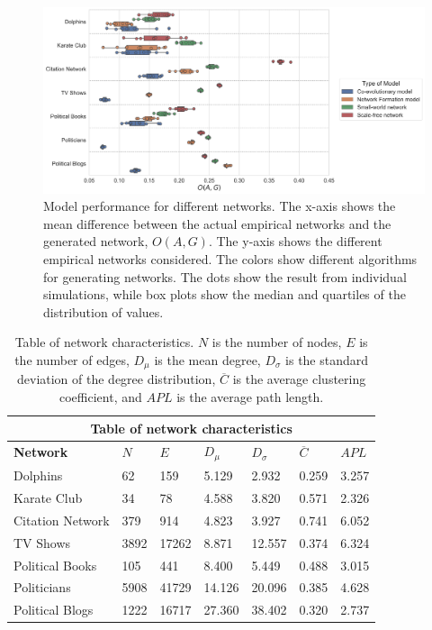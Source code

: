 \documentclass[11pt]{article}
\begin{document}
\begin{figure}[H]
    \centering
    \includegraphics[width=.9\linewidth]{../plots/overall/Model_Evaluation.png}
  \caption{Model performance for different networks. The x-axis shows the mean difference between the actual empirical networks and the generated network, $O(A, G)$. The y-axis shows the different empirical networks considered. The colors show different algorithms for generating networks. The dots show the result from individual simulations, while box plots show the median and quartiles of the distribution of values.}
  \label{fig:eval_mean}
\end{figure}

\begin{table}[H]
    \begin{center}
        
    \begin{tabular}{ |p{3cm}||p{1.6cm}|p{1.6cm}|p{1.6cm}|p{1.6cm}|p{1.6cm}|p{1.6cm}|}
        \hline
        \multicolumn{7}{|c|}{Table of network characteristics} \\
        \hline
        \bf{Network} & $N$ & $E$ & $D_{\mu}$ & $D_{\sigma}$ & $\overline{C}$ & $APL$\\
        \hline
        Dolphins   & 62    &159&   5.129&   2.932 &   0.259 & 3.257\\
        Karate Club &34	&78	&4.588&	3.820&	0.571&	2.326\\
        Citation Network & 379 &	914	& 4.823	& 3.927 & 0.741 & 6.052 \\
        TV Shows & 3892 & 17262&8.871 & 12.557 & 0.374&6.324\\
        Political Books &105 &	441	& 8.400 &	5.449 &	0.488 &	3.015\\
        Politicians&  5908 &41729 & 14.126 & 20.096 &	0.385 & 4.628\\
        Political Blogs &	1222 & 16717 & 27.360 & 38.402 & 0.320 & 2.737\\
        \hline
    \end{tabular}
    \end{center}
    \caption{Table of network characteristics. $N$ is the number of nodes, $E$ is the number of edges, $D_{\mu}$ is the mean degree, $D_{\sigma}$ is the standard deviation of the degree distribution, $\overline{C}$ is the average clustering coefficient, and $APL$ is the average path length. }
    \label{table:characteristics}
    \end{table}
\end{document}
